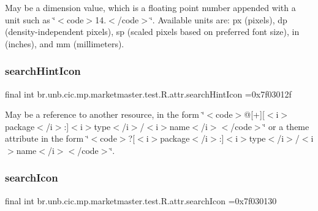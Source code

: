 May be a dimension value, which is a floating point number appended with a unit such as \char`\"{}$<$code$>$14.\+5sp$<$/code$>$\char`\"{}. Available units are\+: px (pixels), dp (density-\/independent pixels), sp (scaled pixels based on preferred font size), in (inches), and mm (millimeters). \mbox{\label{classbr_1_1unb_1_1cic_1_1mp_1_1marketmaster_1_1test_1_1R_1_1attr_a8667e235c81ac0086fe99f03ebb36dfa}} 
\subsubsection{\texorpdfstring{search\+Hint\+Icon}{searchHintIcon}}
{\footnotesize\ttfamily final int br.\+unb.\+cic.\+mp.\+marketmaster.\+test.\+R.\+attr.\+search\+Hint\+Icon =0x7f03012f\hspace{0.3cm}{\ttfamily [static]}}

May be a reference to another resource, in the form \char`\"{}$<$code$>$@\mbox{[}+\mbox{]}\mbox{[}$<$i$>$package$<$/i$>$\+:\mbox{]}$<$i$>$type$<$/i$>$/$<$i$>$name$<$/i$>$$<$/code$>$\char`\"{} or a theme attribute in the form \char`\"{}$<$code$>$?\mbox{[}$<$i$>$package$<$/i$>$\+:\mbox{]}$<$i$>$type$<$/i$>$/$<$i$>$name$<$/i$>$$<$/code$>$\char`\"{}. \mbox{\label{classbr_1_1unb_1_1cic_1_1mp_1_1marketmaster_1_1test_1_1R_1_1attr_a62ea0ddbf3ebeed62437c65d0cbb9555}} 
\subsubsection{\texorpdfstring{search\+Icon}{searchIcon}}
{\footnotesize\ttfamily final int br.\+unb.\+cic.\+mp.\+marketmaster.\+test.\+R.\+attr.\+search\+Icon =0x7f030130\hspace{0.3cm}{\ttfamily [static]}}

